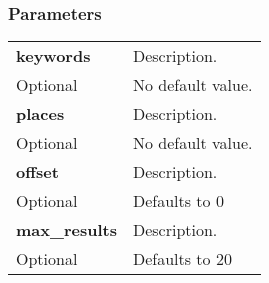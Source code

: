\documentclass[11pt,a4paper]{article}
\newcommand{\content}[1]{\begin{minipage}{10cm}\vspace{2mm}#1\vspace{2mm}\end{minipage}}
\begin{document}
  \subsubsection*{Parameters}
  \begin{table}[h]
    \begin{center}
      \begin{tabular}{l l}
        \hline 
      \textbf{keywords} & \content{Description. }
      \\
      Optional & No default value.\\
      \hline
      \textbf{places} & \content{Description. }
      \\
      Optional & No default value.\\
      \hline
      \textbf{offset} & \content{Description. }
      \\
      Optional & Defaults to 0\\
      \hline
      \textbf{max\_results} & \content{Description. }
      \\
      Optional & Defaults to 20\\
      \hline
      \end{tabular}
    \end{center}
  \end{table}
  
      \newpage
      
\end{document}
